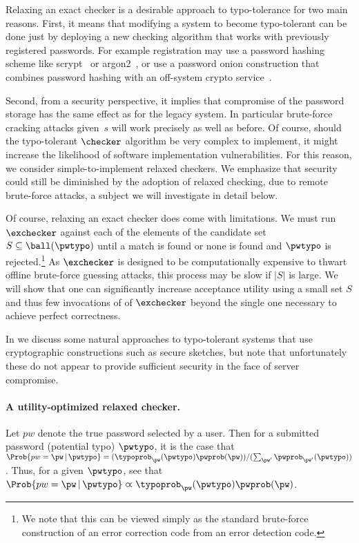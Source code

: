 Relaxing an exact checker is a desirable approach to typo-tolerance
for two main reasons. First, it means that modifying a system to
become typo-tolerant can be done just by deploying a new checking
algorithm that works with previously registered passwords.  For
example registration may use a password hashing scheme like
scrypt~\cite{percival2015scrypt} or argon2~\cite{biryukov2015argon}, or use
a password onion construction that combines password hashing with an
off-system crypto service~\cite{everspaugh2015pythia}.

Second, from a security perspective, it implies that  compromise of the password
storage has the same effect as for the legacy system.  In particular brute-force
cracking attacks given~$s$ will work precisely as well as before. Of course,
should the typo-tolerant $\checker$ algorithm be very complex to implement, it might increase the likelihood of software implementation
vulnerabilities.  For this reason, we consider simple-to-implement relaxed checkers.
We emphasize that security could still be diminished by the adoption of relaxed checking, due to remote
brute-force attacks, a subject we will investigate in detail below.

Of course, relaxing an exact checker does come with limitations. We must run $\exchecker$ against each of the elements of the candidate set  $S \subseteq \ball(\pwtypo)$ until a match is found or none is found and $\pwtypo$ is rejected.\footnote{We note that this can be
  viewed simply as the standard brute-force construction of an error
  correction code from an error detection code.} As $\exchecker$ is designed to be
computationally expensive to thwart offline brute-force guessing attacks, this process may be slow if $|S|$ is large. We will show that one can significantly increase acceptance utility using a small set $S$ and thus few invocations of
of $\exchecker$ beyond the single one necessary to achieve perfect
correctness.

In  we discuss some natural approaches to
typo-tolerant systems that use cryptographic constructions such as
secure sketches, but note that unfortunately these do not appear to
provide sufficient security in the face of server compromise.

\paragraph{A utility-optimized relaxed checker.} Let $pw$ denote the true password selected by a user. Then for a  submitted password (potential typo) $\pwtypo$, it is the case that $\Prob{pw = \pw \,|\, \pwtypo} = (\typoprob_{\pw}(\pwtypo) \pwprob(\pw)) / (\sum_{\pw'} \pwprob_{\pw'}(\pwtypo))$. Thus, for a given $\pwtypo$, see that $\Prob{pw = \pw \,|\, \pwtypo} \varpropto \typoprob_{\pw}(\pwtypo)\pwprob(\pw)$.

